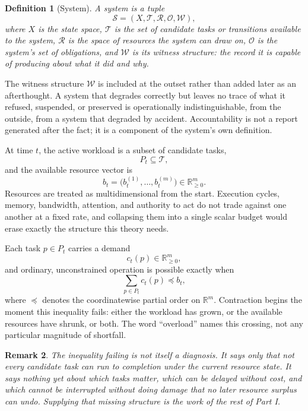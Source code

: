 \documentclass[11pt]{report}
\newtheorem{definition}{Definition}[chapter]
\newtheorem{remark}[definition]{Remark}
\begin{document}
\begin{definition}[System]
A system is a tuple
\[
\mathcal S = (X, \mathcal T, \mathcal R, \mathcal O, \mathcal W),
\]
where $X$ is the state space, $\mathcal T$ is the set of candidate tasks or transitions available to the system, $\mathcal R$ is the space of resources the system can draw on, $\mathcal O$ is the system's set of obligations, and $\mathcal W$ is its witness structure: the record it is capable of producing about what it did and why.
\end{definition}

The witness structure $\mathcal W$ is included at the outset rather than added later as an afterthought. A system that degrades correctly but leaves no trace of what it refused, suspended, or preserved is operationally indistinguishable, from the outside, from a system that degraded by accident. Accountability is not a report generated after the fact; it is a component of the system's own definition.

At time $t$, the active workload is a subset of candidate tasks,
\[
P_t \subseteq \mathcal T,
\]
and the available resource vector is
\[
b_t = \bigl(b_t^{(1)}, \ldots, b_t^{(m)}\bigr) \in \mathbb{R}_{\ge 0}^m.
\]
Resources are treated as multidimensional from the start. Execution cycles, memory, bandwidth, attention, and authority to act do not trade against one another at a fixed rate, and collapsing them into a single scalar budget would erase exactly the structure this theory needs.

Each task $p \in P_t$ carries a demand
\[
c_t(p) \in \mathbb{R}_{\ge 0}^m,
\]
and ordinary, unconstrained operation is possible exactly when
\[
\sum_{p \in P_t} c_t(p) \preceq b_t,
\]
where $\preceq$ denotes the coordinatewise partial order on $\mathbb{R}^m$. Contraction begins the moment this inequality fails: either the workload has grown, or the available resources have shrunk, or both. The word ``overload'' names this crossing, not any particular magnitude of shortfall.

\begin{remark}
The inequality failing is not itself a diagnosis. It says only that not every candidate task can run to completion under the current resource state. It says nothing yet about which tasks matter, which can be delayed without cost, and which cannot be interrupted without doing damage that no later resource surplus can undo. Supplying that missing structure is the work of the rest of Part I.
\end{remark}
\end{document}
